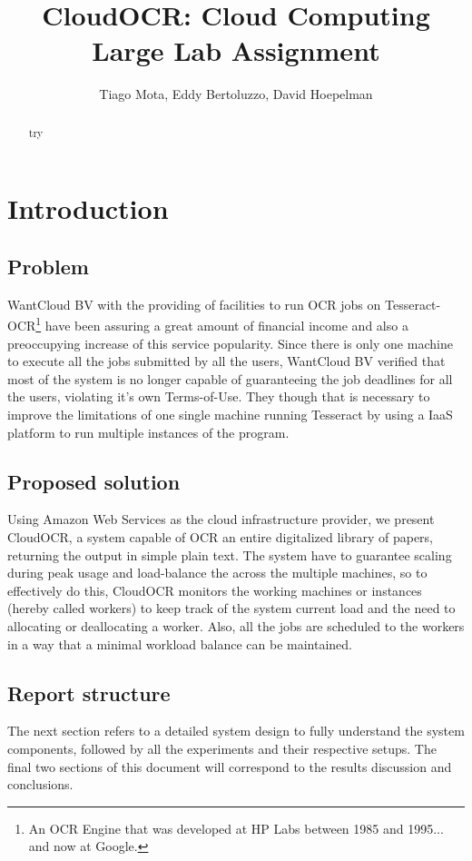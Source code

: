 \documentclass[a4paper]{IEEEtran}
\title{CloudOCR: Cloud Computing Large Lab Assignment}
\author{Tiago Mota, Eddy Bertoluzzo, David Hoepelman}
\begin{document}
\maketitle

\begin{abstract}

try
\end{abstract}

\section{Introduction}


\subsection{Problem}
WantCloud BV with the providing of facilities to run OCR jobs on Tesseract-OCR\footnote{An OCR Engine that was developed at HP Labs between 1985 and 1995... and now at Google.} have been assuring a great amount of financial income and also a preoccupying increase of this service popularity. Since there is only one machine to execute all the jobs submitted by all the users, WantCloud BV verified that most of the system is no longer capable of guaranteeing the job deadlines for all the users, violating it's own Terms-of-Use. They though that is necessary to improve the limitations of one single machine running Tesseract by using a IaaS platform to run multiple instances of the program.

\subsection{Proposed solution}
Using Amazon Web Services as the cloud infrastructure provider, we present CloudOCR, a system capable of OCR an entire digitalized library of papers, returning the output in simple plain text. The system have to guarantee scaling during peak usage and load-balance the across the multiple machines, so to effectively do this, CloudOCR monitors the working machines or instances (hereby called workers) to keep track of the system current load and the need to allocating or deallocating a worker. Also, all the jobs are scheduled to the workers in a way that a minimal workload balance can be maintained.

\subsection{Report structure}
The next section refers to a detailed system design to fully understand the system components, followed by all the experiments and their respective setups. The final two sections of this document will correspond to the results discussion and conclusions.
\end{document}
